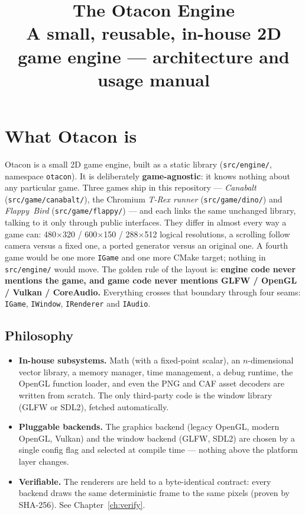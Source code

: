 \documentclass[11pt]{report}
\title{\textbf{The Otacon Engine}\\[4pt]\large A small, reusable, in-house 2D game engine ---
       architecture and usage manual}
\author{}
\date{}
\newcommand{\code}[1]{\texttt{#1}}
\begin{document}
\maketitle
\tableofcontents

\chapter{What Otacon is}
Otacon is a small 2D game engine, built as a static library
(\code{src/engine/}, namespace \code{otacon}). It is deliberately
\textbf{game-agnostic}: it knows nothing about any particular game. Three games
ship in this repository --- \emph{Canabalt} (\code{src/game/canabalt/}), the
Chromium \emph{T-Rex runner} (\code{src/game/dino/}) and \emph{Flappy~Bird}
(\code{src/game/flappy/}) --- and each links the same unchanged library, talking
to it only through public interfaces. They differ in almost every way a game can:
480$\times$320 / 600$\times$150 / 288$\times$512 logical resolutions, a scrolling
follow camera versus a fixed one, a ported generator versus an original one. A
fourth game would be one more \code{IGame} and one more CMake target; nothing in
\code{src/engine/} would move. The golden rule of the layout is: \textbf{engine
code never mentions the game, and game code never mentions GLFW / OpenGL / Vulkan
/ CoreAudio.} Everything crosses that boundary through four seams: \code{IGame},
\code{IWindow}, \code{IRenderer} and \code{IAudio}.

\section{Philosophy}
\begin{itemize}[nosep]
  \item \textbf{In-house subsystems.} Math (with a fixed-point scalar), an
        $n$-dimensional vector library, a memory manager, time management, a debug
        runtime, the OpenGL function loader, and even the PNG and CAF asset
        decoders are written from scratch. The only third-party code is the window
        library (GLFW or SDL2), fetched automatically.
  \item \textbf{Pluggable backends.} The graphics backend (legacy OpenGL, modern
        OpenGL, Vulkan) and the window backend (GLFW, SDL2) are chosen by a single
        config flag and selected at compile time --- nothing above the platform
        layer changes.
  \item \textbf{Verifiable.} The renderers are held to a byte-identical contract:
        every backend draws the same deterministic frame to the same pixels (proven
        by SHA-256). See Chapter~\ref{ch:verify}.
\end{itemize}
\end{document}
